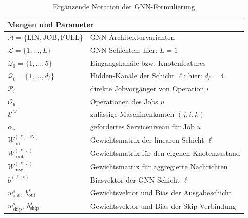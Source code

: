 \begin{table}[H]
\centering
\caption{Ergänzende Notation der GNN-Formulierung}
\label{tab:notation_fjsp_gnn}
\scriptsize
\setlength{\tabcolsep}{3pt}
\renewcommand{\arraystretch}{0.88}
\begin{tabularx}{\textwidth}{@{}lX@{}}
\toprule
\multicolumn{2}{l}{\textbf{Mengen und Parameter}}\\
\midrule

$\mathcal{A}=\{\mathrm{LIN},\mathrm{JOB},\mathrm{FULL}\}$
& GNN-Architekturvarianten \\

$\mathcal{L}=\{1,\dots,L\}$
& GNN-Schichten; hier: $L=1$ \\

$\mathcal{Q}_0=\{1,\dots,5\}$
& Eingangskanäle bzw. Knotenfeatures \\

$\mathcal{Q}_{\ell}=\{1,\dots,d_{\ell}\}$
& Hidden-Kanäle der Schicht $\ell$; hier: $d_{\ell}=4$ \\

$\mathcal{P}_i$
& direkte Jobvorgänger von Operation $i$ \\

$\mathcal{O}_u$
& Operationen des Jobs $u$ \\

$\mathcal{E}^{M}$
& zulässige Maschinenkanten $(j,i,k)$ \\

$\alpha_u$
& gefordertes Serviceniveau für Job $u$ \\

$W_{\mathrm{lin}}^{(\ell,\mathrm{LIN})}$
& Gewichtsmatrix der linearen Schicht $\ell$ \\

$W_{\mathrm{root}}^{(\ell,s)}$
& Gewichtsmatrix für den eigenen Knotenzustand \\

$W_{\mathrm{msg}}^{(\ell,s)}$
& Gewichtsmatrix für aggregierte Nachrichten \\

$b^{(\ell,s)}$
& Biasvektor der GNN-Schicht $\ell$ \\

$w_{\mathrm{out}}^s,\ b_{\mathrm{out}}^s$
& Gewichtsvektor und Bias der Ausgabeschicht \\

$w_{\mathrm{skip}}^s,\ b_{\mathrm{skip}}^s$
& Gewichtsvektor und Bias der Skip-Verbindung \\


\end{tabularx}
\end{table}
